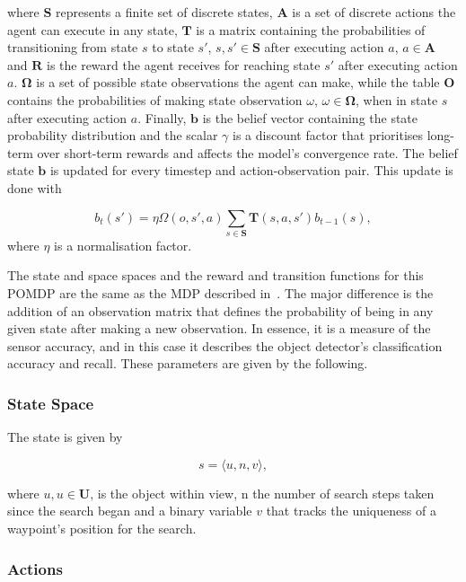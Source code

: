 \documentclass[runningheads]{llncs}
\begin{document}
\noindent where $\mathbf{S}$ represents a finite set of discrete states, $\mathbf{A}$ is a set of discrete actions the agent can execute in any state, $\mathbf{T}$ is a matrix containing the probabilities of transitioning from state $s$ to state $s'$, $s, s' \in \mathbf{S}$ after executing action $a$, $a \in \mathbf{A}$ and $\mathbf{R}$ is the reward the agent receives for reaching state $s'$ after executing action $a$.
$\mathbf{\Omega}$ is a set of possible state observations the agent can make, while the table $\mathbf{O}$ contains the probabilities of making state observation $\omega$, $\omega \in \mathbf{\Omega}$, when in state $s$ after executing action $a$.
Finally, $\mathbf{b}$ is the belief vector containing the state probability distribution and the scalar $\gamma$ is a discount factor that prioritises long-term over short-term rewards and affects the model's convergence rate. 
The belief state $\mathbf{b}$ is updated for every timestep and action-observation pair.
This update is done with

\begin{equation}
  b_t(s') = \eta\Omega(o, s', a)\sum_{s\in\mathbf{S}}\mathbf{T}(s, a, s')b_{t-1}(s), 
\end{equation}
where $\eta$ is a normalisation factor. 

The state and space spaces and the reward and transition functions for this POMDP are the same as the MDP described in~\cite{lock2019active}. 
The major difference is the addition of an observation matrix that defines the probability of being in any given state after making a new observation.
In essence, it is a measure of the sensor accuracy, and in this case it describes the object detector's classification accuracy and recall.
These parameters are given by the following. 

\subsubsection{State Space}

The state is given by

\begin{equation}
  s = \langle u, n, v \rangle,
\end{equation}

\noindent where $u, u\in\mathbf{U}$, is the object within view, n the number of search steps taken since the search began and a binary variable $v$ that tracks the uniqueness of a waypoint's position for the search.

\subsubsection{Actions}
\end{document}
